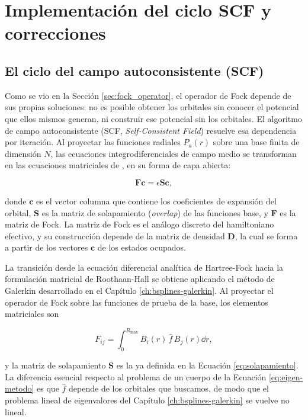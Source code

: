 \chapter{Implementación del ciclo SCF y correcciones}
\label{ch:ciclo-scf}

\section{El ciclo del campo autoconsistente (SCF)}

Como se vio en la Sección \ref{sec:fock_operator}, el operador de Fock depende de sus propias soluciones: no es posible obtener los orbitales sin conocer el potencial que ellos mismos generan, ni construir ese potencial sin los orbitales. El algoritmo de campo autoconsistente (SCF, \textit{Self-Consistent Field}) resuelve esa dependencia por iteración. Al proyectar las funciones radiales $P_a(r)$ sobre una base finita de dimensión $N$, las ecuaciones integrodiferenciales de campo medio se transforman en las ecuaciones matriciales de \textcite{Roothaan1960}, en su forma de capa abierta:

\begin{equation}
  \bm{F}\bm{c} = \epsilon\bm{S}\bm{c},
\end{equation}

donde $\bm{c}$ es el vector columna que contiene los coeficientes de expansión del orbital, $\bm{S}$ es la matriz de solapamiento (\textit{overlap}) de las funciones base, y $\bm{F}$ es la matriz de Fock. La matriz de Fock es el análogo discreto del hamiltoniano efectivo, y su construcción depende de la matriz de densidad $\bm{D}$, la cual se forma a partir de los vectores $\bm{c}$ de los estados ocupados.

La transición desde la ecuación diferencial analítica de Hartree-Fock hacia la formulación matricial de Roothaan-Hall se obtiene aplicando el método de Galerkin desarrollado en el Capítulo \ref{ch:bsplines-galerkin}. Al proyectar el operador de Fock sobre las funciones de prueba de la base, los elementos matriciales son

\begin{equation}
\label{eq:fock-matrix-elements}
  F_{ij} = \int_0^{R_{\text{max}}} B_i(r)\, \hat{f}\, B_j(r) \dd{r},
\end{equation}

y la matriz de solapamiento $\bm{S}$ es la ya definida en la Ecuación \eqref{eq:solapamiento}. La diferencia esencial respecto al problema de un cuerpo de la Ecuación \eqref{eq:eigen-metodo} es que $\hat{f}$ depende de los orbitales que buscamos, de modo que el problema lineal de eigenvalores del Capítulo \ref{ch:bsplines-galerkin} se vuelve no lineal.

